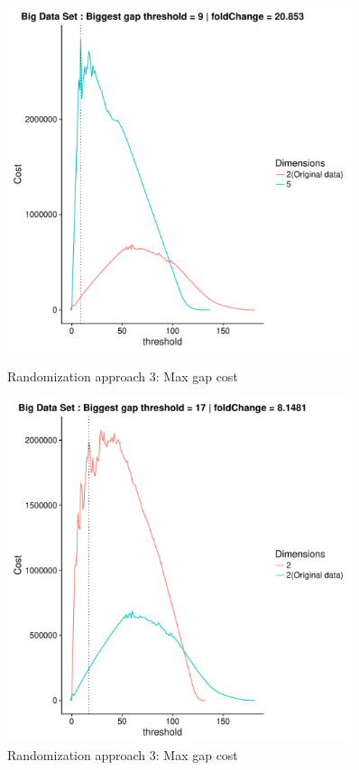 \documentclass[a4paper,10pt]{article}
\theoremstyle{plain}
\theoremstyle{definition}
\begin{document}
\begin{figure}[H]
	\centering
	\begin{minipage}{0.75\textwidth}
		\centering
		\includegraphics[width=0.9\textwidth]{./plots/plotsCostAndSimAp234/plotBigDataCostAndSim-AP3-S7-K5.pdf}
		\caption{Randomization approach 3: Max gap cost}
		\label{fig:maxGapCostBigDataAp3K5}
	\end{minipage}
	\begin{minipage}{0.75\textwidth}
		\centering
		\includegraphics[width=0.9\textwidth]{./plots/plotsCostAndSimAp234/plotBigDataCostAndSim-AP3-S42-K2.pdf}
		\caption{Randomization approach 3: Max gap cost}
		\label{fig:maxGapCostBigDataAp3K2}
	\end{minipage}
\end{figure}
\end{document}
